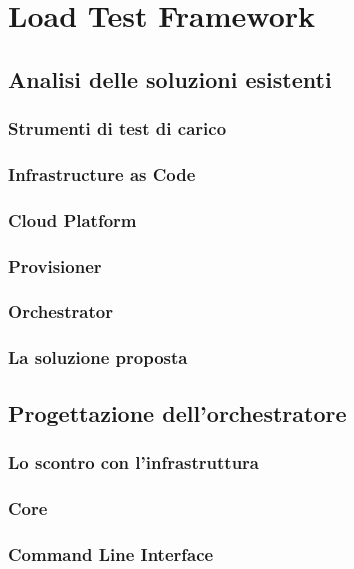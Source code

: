 
\chapter{Load Test Framework}
\label{cap:descrizione-stage}
\section{Analisi delle soluzioni esistenti}
\subsection{Strumenti di test di carico}
\subsection{Infrastructure as Code}
\subsection{Cloud Platform}
\subsection{Provisioner}
\subsection{Orchestrator}
\subsection{La soluzione proposta}
\section{Progettazione dell'orchestratore}
\subsection{Lo scontro con l'infrastruttura}
\subsection{Core}
\subsection{Command Line Interface}
